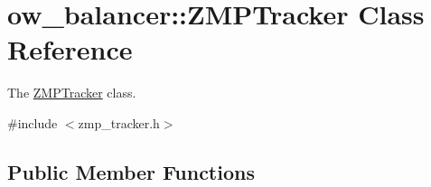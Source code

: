 \hypertarget{classow__balancer_1_1ZMPTracker}{}\section{ow\+\_\+balancer\+:\+:Z\+M\+P\+Tracker Class Reference}
\label{classow__balancer_1_1ZMPTracker}


The \hyperlink{classow__balancer_1_1ZMPTracker}{Z\+M\+P\+Tracker} class.  




{\ttfamily \#include $<$zmp\+\_\+tracker.\+h$>$}

\subsection*{Public Member Functions}
